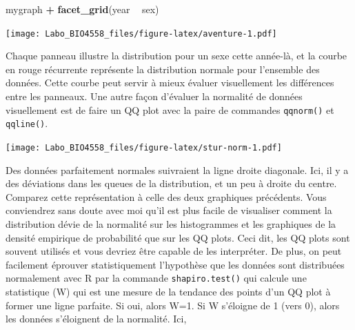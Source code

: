 \documentclass[12pt,]{book}
\newenvironment{Shaded}{\begin{snugshade}}{\end{snugshade}}
\newcommand{\KeywordTok}[1]{\textcolor[rgb]{0.27,0.27,0.27}{\textbf{#1}}}
\newcommand{\NormalTok}[1]{#1}
\newcommand{\OperatorTok}[1]{\textcolor[rgb]{0.43,0.43,0.43}{\textbf{#1}}}
\newcommand{\StringTok}[1]{\textcolor[rgb]{0.5,0.5,0.5}{#1}}
\begin{document}
\begin{Shaded}
\begin{Highlighting}[]
\NormalTok{mygraph }\OperatorTok{+}\StringTok{ }\KeywordTok{facet_grid}\NormalTok{(year }\OperatorTok{~}\StringTok{ }\NormalTok{sex)}
\end{Highlighting}
\end{Shaded}

\texttt{[image: Labo\_BIO4558\_files/figure-latex/aventure-1.pdf]}

Chaque panneau illustre la distribution pour un sexe cette année-là, et la courbe en rouge récurrente représente la distribution normale pour l'ensemble des données.
Cette courbe peut servir à mieux évaluer visuellement les différences entre les panneaux.
Une autre façon d'évaluer la normalité de données visuellement est de faire un QQ plot avec la paire de commandes \texttt{qqnorm()} et \texttt{qqline()}.

\begin{Shaded}
\end{Shaded}

\texttt{[image: Labo\_BIO4558\_files/figure-latex/stur-norm-1.pdf]}

Des données parfaitement normales suivraient la ligne droite diagonale.
Ici, il y a des déviations dans les queues de la distribution, et un peu à droite du centre.
Comparez cette représentation à celle des deux graphiques précédents.
Vous conviendrez sans doute avec moi qu'il est plus facile de visualiser comment la distribution dévie de la normalité sur les histogrammes et les graphiques de la densité empirique de probabilité que sur les QQ plots.
Ceci dit, les QQ plots sont souvent utilisés et vous devriez être capable de les interpréter.
De plus, on peut facilement éprouver statistiquement l'hypothèse que les données sont distribuées normalement avec R par la commande \texttt{shapiro.test()} qui calcule une statistique (W) qui est une mesure de la tendance des points d'un QQ plot à former une ligne parfaite.
Si oui, alors W=1.
Si W s'éloigne de 1 (vers 0), alors les données s'éloignent de la normalité.
Ici,

\begin{Shaded}
\end{Shaded}
\end{document}
